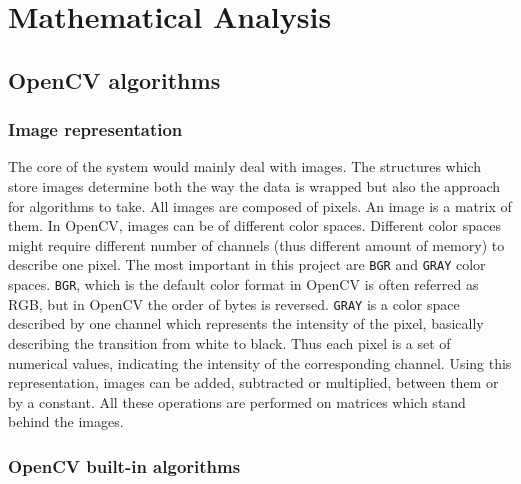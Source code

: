 \section{Mathematical Analysis}
\subsection{OpenCV algorithms}
    \subsubsection{Image representation}
      The core of the system would mainly deal with images. The structures which store images determine both the way the data is wrapped but also the approach for algorithms to take. All images are composed of pixels. An image is a matrix of them. In OpenCV, images can be of different color spaces. Different color spaces might require different number of channels (thus different amount of memory) to describe one pixel. The most important in this project are \verb|BGR| and \verb|GRAY| color spaces. \verb|BGR|, which is the default color format in OpenCV is often referred as RGB, but in OpenCV the order of bytes is reversed. \verb|GRAY| is a color space described by one channel which represents the intensity of the pixel, basically describing the transition from white to black. Thus each pixel is a set of numerical values, indicating the intensity of the corresponding channel. Using this representation, images can be added, subtracted or multiplied, between them or by a constant. All these operations are performed on matrices which stand behind the images. 
    \subsubsection{OpenCV built-in algorithms}

